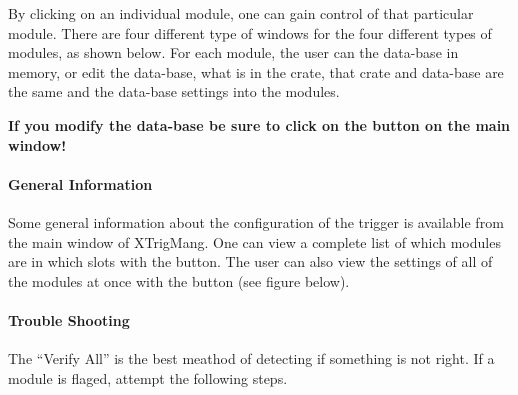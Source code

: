 
		
	By clicking on an individual module,  one can gain control of that particular module.  There are four different type of windows for the four different types of modules,  as shown below. For each module,  the user can  the data-base in memory,   or edit the data-base,   what is in the crate,   that crate and data-base are the same and  the data-base settings into the modules.

		
	{\bf If you modify the data-base be sure to click on the  button on the main window!}

 
\paragraph{ General Information}

	 Some general information about the configuration of the trigger is available from the main window of XTrigMang.  One can view a complete list of which modules are in which slots with the  button. The user can also view the settings of all of the modules at once with the  button (see figure below).
	


\paragraph{ Trouble Shooting }

	The ``Verify All'' is the best meathod of detecting if something is not right.  If a module is flaged, attempt the following steps.  

